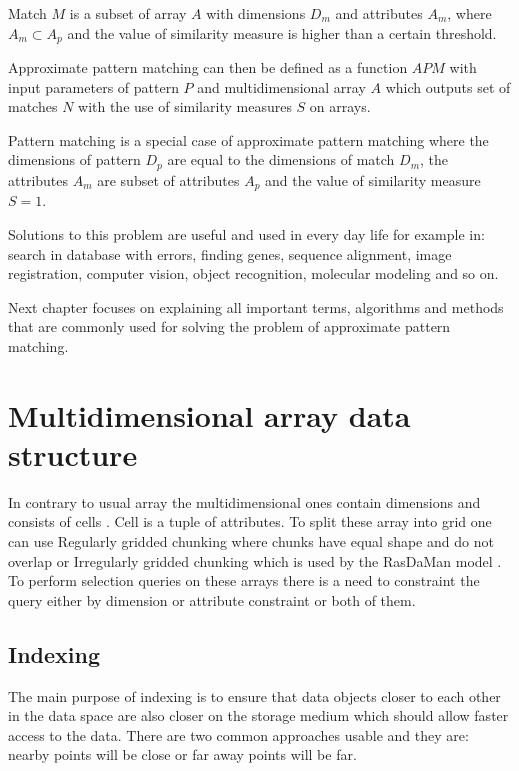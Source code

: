 Match $M$ is a subset of array $A$ with dimensions $D_m$ and attributes $A_m$, where $A_m \subset A_p$ and the value of similarity measure is higher than a certain threshold.

Approximate pattern matching can then be defined as a function $APM$ with input parameters of pattern $P$ and multidimensional array $A$ which outputs set of matches $N$ with the use of similarity measures $S$ on arrays.

Pattern matching is a special case of approximate pattern matching where the dimensions of pattern $D_p$ are equal to the dimensions of match $D_m$, the attributes $A_m$ are subset of attributes $A_p$ and the value of similarity measure $S = 1$.

Solutions to this problem are useful and used in every day life for example in: search in database with errors, finding genes, sequence alignment, image registration, computer vision, object recognition, molecular modeling and so on. 

Next chapter focuses on explaining all important terms, algorithms and methods that are commonly used for solving the problem of approximate pattern matching.


\section{Multidimensional array data structure}
In contrary to usual array the multidimensional ones contain dimensions and consists of cells \cite{samet}. Cell is a tuple of attributes. To split these array into grid one can use Regularly gridded chunking where chunks have equal shape and do not overlap or Irregularly gridded chunking which is used by the RasDaMan model \cite{rasdaman}.
To perform selection queries on these arrays there is a need to constraint the query either by dimension or attribute constraint or both of them.
\subsection{Indexing}
The main purpose of indexing is to ensure that data objects closer to each other in the data space are also closer on the storage medium which should allow faster access to the data. There are two common approaches usable and they are: nearby points will be close or far away points will be far. 
